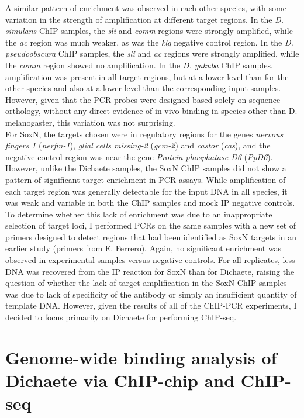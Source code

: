 A similar pattern of enrichment was observed in each other species, with some variation in the strength of amplification at different target regions. In the \emph{D. simulans} ChIP samples, the \emph{sli} and \emph{comm} regions were strongly amplified, while the \emph{ac} region was much weaker, as was the \emph{klg} negative control region. In the \emph{D. pseudoobscura} ChIP samples, the \emph{sli} and \emph{ac} regions were strongly amplified, while the \emph{comm} region showed no amplification. In the \emph{D. yakuba} ChIP samples, amplification was present in all target regions, but at a lower level than for the other species and also at a lower level than the corresponding input samples. However, given that the PCR probes were designed based solely on sequence orthology, without any direct evidence of in vivo binding in species other than D. melanogaster, this variation was not surprising.\\

For SoxN, the targets chosen were in regulatory regions for the genes \emph{nervous fingers 1} (\emph{nerfin-1}), \emph{glial cells missing-2} (\emph{gcm-2}) and \emph{castor} (\emph{cas}), and the negative control region was near the gene \emph{Protein phosphatase D6} (\emph{PpD6}). However, unlike the Dichaete samples, the SoxN ChIP samples did not show a pattern of significant target enrichment in PCR assays. While amplification of each target region was generally detectable for the input DNA in all species, it was weak and variable in both the ChIP samples and mock IP negative controls. To determine whether this lack of enrichment was due to an inappropriate selection of target loci, I performed PCRs on the same samples with a new set of primers designed to detect regions that had been identified as SoxN targets in an earlier study \citep{girard_chromatin_2006} (primers from E. Ferrero). Again, no significant enrichment was observed in experimental samples versus negative controls. For all replicates, less DNA was recovered from the IP reaction for SoxN than for Dichaete, raising the question of whether the lack of target amplification in the SoxN ChIP samples was due to lack of specificity of the antibody or simply an insufficient quantity of template DNA. However, given the results of all of the ChIP-PCR experiments, I decided to focus primarily on Dichaete for performing ChIP-seq.

\section{Genome-wide binding analysis of Dichaete via ChIP-chip and ChIP-seq}
